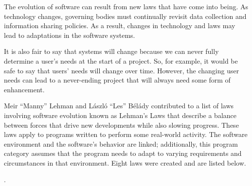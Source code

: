 The evolution of software can result from new laws that have come into being. As technology changes, governing bodies must continually revisit data collection and information sharing policies. As a result, changes in technology and laws may lead to adaptations in the software systems.

It is also fair to say that systems will change because we can never fully determine a user's needs at the start of a project. So, for example, it would be safe to say that users' needs will change over time. However, the changing user needs can lead to a never-ending project that will always need some form of enhancement.

Meir ``Manny'' Lehman and László ``Les'' Bélády contributed to a list of laws involving software evolution known as Lehman's Laws that describe a balance between forces that drive new developments while also slowing progress. These laws apply to programs written to perform some real-world activity. The software environment and the software's behavior are linked; additionally, this program category assumes that the program needs to adapt to varying requirements and circumstances in that environment. Eight laws were created and are listed below. \cite{wiki:lehmans-laws}

.

